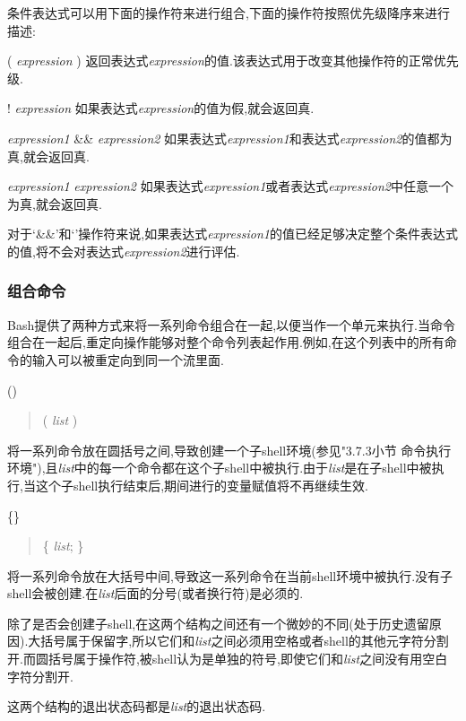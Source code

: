 \documentclass[draft,openany]{book}
\begin{document}
\begin{CJK}{UTF8}{gbsn}
\begin{basedescript}{\desclabelstyle{\nextlinelabel}\desclabelwidth{2.5em}}
        条件表达式可以用下面的操作符来进行组合,下面的操作符按照优先级降序来进行描述:\par
        \begin{basedescript}{\desclabelstyle{\nextlinelabel}\desclabelwidth{2.5em}}
        \item[( \emph{expression} )]
            返回表达式\emph{expression}的值.该表达式用于改变其他操作符的正常优先级.
        \item[! \emph{expression}]
            如果表达式\emph{expression}的值为假,就会返回真.
        \item[\emph{expression1} \&\& \emph{expression2}]
            如果表达式\emph{expression1}和表达式\emph{expression2}的值都为真,就会返回真.
        \item[\emph{expression1} \textbar\textbar \emph{expression2}]
            如果表达式\emph{expression1}或者表达式\emph{expression2}中任意一个为真,就会返回真.
        \end{basedescript}
        对于`\&\&'和`\textbar\textbar'操作符来说,如果表达式\emph{expression1}的值已经足够决定整个条件表达式的值,将不会对表达式\emph{expression2}进行评估.
    \end{basedescript}

    \subsubsection{组合命令}
    Bash提供了两种方式来将一系列命令组合在一起,以便当作一个单元来执行.当命令组合在一起后,重定向操作能够对整个命令列表起作用.例如,在这个列表中的所有命令的输入可以被重定向到同一个流里面.\par
    \begin{basedescript}{\desclabelstyle{\nextlinelabel}\desclabelwidth{2.5em}}
    \item[()]
        \begin{quote}
            ( \emph{list} )
        \end{quote}
        将一系列命令放在圆括号之间,导致创建一个子shell环境(参见"3.7.3小节 命令执行环境"),且\emph{list}中的每一个命令都在这个子shell中被执行.由于\emph{list}是在子shell中被执行,当这个子shell执行结束后,期间进行的变量赋值将不再继续生效.
    \item[\{\}]
        \begin{quote}
            \{ \emph{list}; \}
        \end{quote}
        将一系列命令放在大括号中间,导致这一系列命令在当前shell环境中被执行.没有子shell会被创建.在\emph{list}后面的分号(或者换行符)是必须的.
    \end{basedescript}
    除了是否会创建子shell,在这两个结构之间还有一个微妙的不同(处于历史遗留原因).大括号属于保留字,所以它们和\emph{list}之间必须用空格或者shell的其他元字符分割开.而圆括号属于操作符,被shell认为是单独的符号,即使它们和\emph{list}之间没有用空白字符分割开.\par
    这两个结构的退出状态码都是\emph{list}的退出状态码.

\end{CJK}
\end{document}
